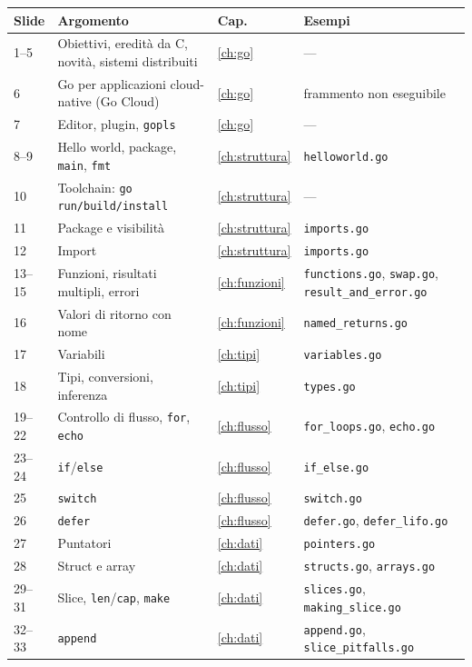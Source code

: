 \documentclass[11pt,a4paper]{report}
\newcommand{\cod}[1]{\texttt{#1}}
\begin{document}
\begin{center}
\footnotesize
\renewcommand{\arraystretch}{1.15}
\begin{longtable}{@{}L{1.4cm}L{4.9cm}L{1.2cm}L{6.1cm}@{}}
\toprule
\textbf{Slide} & \textbf{Argomento} & \textbf{Cap.} & \textbf{Esempi}\\
\midrule
{}--5 & Obiettivi, eredità da C, novità, sistemi distribuiti & \ref{ch:go} & ---\\
6 & Go per applicazioni cloud-native (Go Cloud) & \ref{ch:go} & frammento non eseguibile\\
7 & Editor, plugin, \cod{gopls} & \ref{ch:go} & ---\\
8--9 & Hello world, package, \cod{main}, \cod{fmt} & \ref{ch:struttura} & \texttt{helloworld.go}\\
10 & Toolchain: \cod{go run/build/install} & \ref{ch:struttura} & ---\\
11 & Package e visibilità & \ref{ch:struttura} & \texttt{imports.go}\\
12 & Import & \ref{ch:struttura} & \texttt{imports.go}\\
13--15 & Funzioni, risultati multipli, errori & \ref{ch:funzioni} & \texttt{functions.go}, \texttt{swap.go}, \texttt{result\_and\_error.go}\\
16 & Valori di ritorno con nome & \ref{ch:funzioni} & \texttt{named\_returns.go}\\
17 & Variabili & \ref{ch:tipi} & \texttt{variables.go}\\
18 & Tipi, conversioni, inferenza & \ref{ch:tipi} & \texttt{types.go}\\
19--22 & Controllo di flusso, \cod{for}, \cod{echo} & \ref{ch:flusso} & \texttt{for\_loops.go}, \texttt{echo.go}\\
23--24 & \cod{if}/\cod{else} & \ref{ch:flusso} & \texttt{if\_else.go}\\
25 & \cod{switch} & \ref{ch:flusso} & \texttt{switch.go}\\
26 & \cod{defer} & \ref{ch:flusso} & \texttt{defer.go}, \texttt{defer\_lifo.go}\\
27 & Puntatori & \ref{ch:dati} & \texttt{pointers.go}\\
28 & Struct e array & \ref{ch:dati} & \texttt{structs.go}, \texttt{arrays.go}\\
29--31 & Slice, \cod{len}/\cod{cap}, \cod{make} & \ref{ch:dati} & \texttt{slices.go}, \texttt{making\_slice.go}\\
32--33 & \cod{append} & \ref{ch:dati} & \texttt{append.go}, \texttt{slice\_pitfalls.go}\\

\end{longtable}
\end{center}
\end{document}
